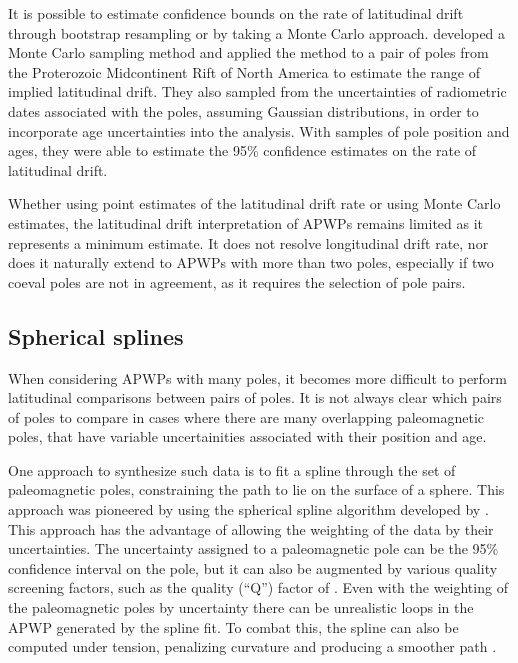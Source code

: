 \documentclass[11pt,letterpaper]{article}
\begin{document}
It is possible to estimate confidence bounds on the rate of latitudinal drift through bootstrap resampling \citep[e.g.][]{Tarduno1990b} or by taking a Monte Carlo approach. \citet{Swanson-Hysell2014b} developed a Monte Carlo sampling method and applied the method to a pair of poles from the Proterozoic Midcontinent Rift of North America to estimate the range of implied latitudinal drift. They also sampled from the uncertainties of radiometric dates associated with the poles, assuming Gaussian distributions, in order to incorporate age uncertainties into the analysis. With samples of pole position and ages, they were able to estimate the 95\% confidence estimates on the rate of latitudinal drift.

Whether using point estimates of the latitudinal drift rate or using Monte Carlo estimates, the latitudinal drift interpretation of APWPs remains limited as it represents a minimum estimate. It does not resolve longitudinal drift rate, nor does it naturally extend to APWPs with more than two poles, especially if two coeval poles are not in agreement, as it requires the selection of pole pairs.

\subsection*{Spherical splines}
When considering APWPs with many poles, it becomes more difficult to perform latitudinal comparisons between pairs of poles. It is not always clear which pairs of poles to compare in cases where there are many overlapping paleomagnetic poles, that have variable uncertainities associated with their position and age.

One approach to synthesize such data is to fit a spline through the set of paleomagnetic poles, constraining the path to lie on the surface of a sphere. This approach was pioneered by \citet{Torsvik1992a} using the spherical spline algorithm developed by \citet{Jupp1987a}. This approach has the advantage of allowing the weighting of the data by their uncertainties. The uncertainty assigned to a paleomagnetic pole can be the 95\% confidence interval on the pole, but it can also be augmented by various quality screening factors, such as the quality (``Q'') factor of \citet{Van-der-Voo1990a} \citep{Torsvik1992a}. Even with the weighting of the paleomagnetic poles by uncertainty there can be unrealistic loops in the APWP generated by the spline fit. To combat this, the spline can also be computed under tension, penalizing curvature and producing a smoother path \citep{Torsvik1996a}.
\end{document}
